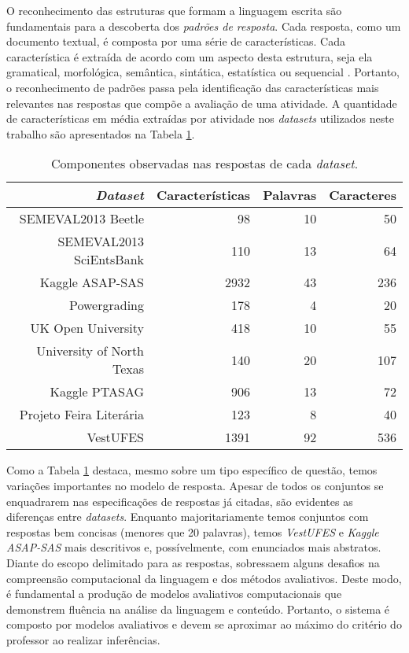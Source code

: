O reconhecimento das estruturas que formam a linguagem escrita são fundamentais para a descoberta dos \textit{padrões de resposta}. Cada resposta, como um documento textual, é composta por uma série de características. Cada característica é extraída de acordo com um aspecto desta estrutura, seja ela gramatical, morfológica, semântica, sintática, estatística ou sequencial \cite{kumar2019}. Portanto, o reconhecimento de padrões passa pela identificação das características mais relevantes nas respostas que compõe a avaliação de uma atividade. A quantidade de características em média extraídas por atividade nos \textit{datasets} utilizados neste trabalho são apresentados na  Tabela \ref{tab-features}.

\begin{table}
\centering
\caption{Componentes observadas nas respostas de cada \textit{dataset}.}
\label{tab-features}
\begin{tabular}{|r | r r r|} \hline
\textit{Dataset} & Características & Palavras & Caracteres \\
\hline
 SEMEVAL2013 Beetle & 98 & 10 & 50 \\
 SEMEVAL2013 SciEntsBank & 110 & 13 & 64 \\
 Kaggle ASAP-SAS & 2932 & 43 & 236 \\
 Powergrading & 178 & 4 & 20 \\
 UK Open University & 418 & 10 & 55 \\
 University of North Texas & 140 & 20 & 107 \\
 Kaggle PTASAG & 906 & 13 & 72 \\
 Projeto Feira Liter{\'a}ria & 123 & 8 & 40 \\
 VestUFES & 1391 & 92 & 536 \\
\hline \hline
\end{tabular}
\end{table}

Como a Tabela \ref{tab-features} destaca, mesmo sobre um tipo específico de questão, temos variações importantes no modelo de resposta. Apesar de todos os conjuntos se enquadrarem nas especificações de respostas já citadas, são evidentes as diferenças entre \textit{datasets}. Enquanto majoritariamente temos conjuntos com respostas bem concisas (menores que 20 palavras), temos \textit{VestUFES} e \textit{Kaggle ASAP-SAS} mais descritivos e, possívelmente, com enunciados mais abstratos. Diante do escopo delimitado para as respostas, sobressaem alguns desafios na compreensão computacional da linguagem e dos métodos avaliativos. Deste modo, é fundamental a produção de modelos avaliativos computacionais que demonstrem fluência na análise da linguagem e conteúdo. Portanto, o sistema é composto por modelos avaliativos e devem se aproximar ao máximo do critério do professor ao realizar inferências.


